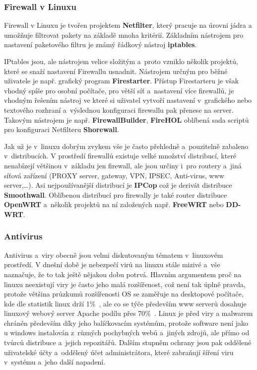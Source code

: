 \documentclass[a4paper,12pt]{article}
\renewcommand{\b}[1]{\textbf{#1}} %
\begin{document}
\subsubsection{Firewall v Linuxu}
Firewall v Linuxu je tvořen projektem \b{Netfilter}, který pracuje na úrovni jádra a umožňuje filtrovat pakety na základě mnoha kritérií. Základním nástrojem pro nastavení paketového filtru je známý řádkový nástroj \b{iptables}.~\cite{FirewallNetfilter}

IPtables jsou, ale nástrojem velice složitým a~proto vzniklo několik projektů, které se snaží nastavení Firewallu usnadnit. Nástrojem určným pro běžné uživatele je např. grafický program \b{Firestarter}. Přístup Firestarteru je však vhodný spíše pro osobní počítače, pro větší síť a~nastavení více firewallů, je vhodným řešením nástroj ve které si uživatel vytvoří nastavení v~grafického nebo textového rozhraní a~výslednou konfiguraci firewallu pak přenese na server. Takovým nástrojem je např. \b{FirewallBuilder}, \b{FireHOL} oblíbená sada scriptů pro konfiguraci Netfilteru \b{Shorewall}.

Jak už je v~linuxu dobrým zvykem vše je často přehledně a~pouzitelně zabaleno v~distribucích. V prostředí firewallů existuje velké množství distribucí, které nenabízejí většinou v~základu jen firewall, ale jsou určiny i~pro routery a~jiná síťová zařízení (PROXY server, gateway, VPN, IPSEC, Anti-virus, www server,…). Asi nejpoužívanější distribucí je \b{IPCop} což je derivát distribuce \b{Smoothwall}. Oblíbenou distribucí pro firewally je také router distribuce \b{OpenWRT} a~několik projektů na ní založených např. \b{FreeWRT} nebo \b{DD-WRT}.

\subsubsection{Antivirus}\label{sec:antivirus}
Antivirus a~viry obecně jsou velmi diskutovaným tématem v~linuxovém prostředí. V dnešní době je nebezpečí virů na linuxu stále mizivé a~vše naznačuje, že to tak ještě nějakou dobu potrvá. Hlavním argumentem proč na linuxu neexistují viry je často jeho malá rozšířenost, což není tak úplně pravda, protože většina průzkumů rozšířenosti OS se zaměřuje na desktopové počítače, kde dle statistik linux drží 1\%~\cite{StatistikaOS}, ale co se týče především www serverů dosahuje linuxový webový server Apache podílu přes 70\%~\cite{StatLinuxWebServer}. Linux je před viry a malwarem chráněn především díky jeho balíčkovacím systémům, protože software není jako u windows instalován z~různých pochybných webů a~jiných zdrojů, ale přímo od tvůrců distribuce a~jejich repozitářů. Dalším stupněm ochrany jsou pak oddělené uživatelské účty a~oddělený účet administrátora, které zabraňují šíření viru v~systému a~jeho další napadení.~\cite{LinuxCZviry}
\end{document}
